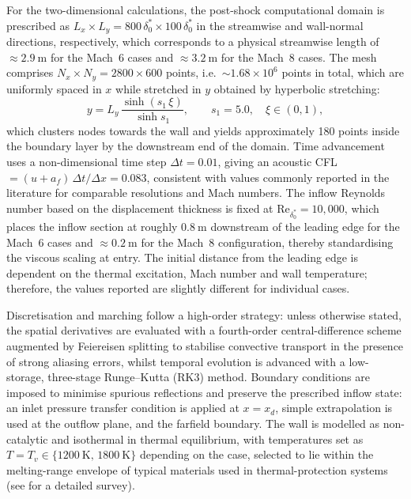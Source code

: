 For the two-dimensional calculations, the post-shock computational domain is prescribed as $L_x\times L_y=800\,\delta^{*}_{0}\times 100\,\delta^{*}_{0}$ in the streamwise and wall-normal directions, respectively, which corresponds to a physical streamwise length of $\approx 2.9~\mathrm{m}$ for the Mach~6 cases and $\approx 3.2~\mathrm{m}$ for the Mach~8 cases. The mesh comprises $N_x\times N_y=2800\times 600$ points, i.e.\ $\sim 1.68\times 10^{6}$ points in total, which are uniformly spaced in $x$ while stretched in $y$ obtained by hyperbolic stretching:
\begin{equation}
y=L_y\,\frac{\sinh\!\left(s_1\,\xi\right)}{\sinh s_1},\qquad s_1=5.0,\quad \xi\in(0,1),
\end{equation}
which clusters nodes towards the wall and yields approximately 180 points inside the boundary layer by the downstream end of the domain. Time advancement uses a non-dimensional time step $\Delta t=0.01$, giving an acoustic \gls{CFL}$=(u+a_f)\,\Delta t/\Delta x=0.083$, consistent with values commonly reported in the literature for comparable resolutions and Mach numbers. The inflow Reynolds number based on the displacement thickness is fixed at $\mathrm{Re}_{\delta^{*}_0}=10{,}000$, which places the inflow section at roughly $ 0.8~\mathrm{m}$ downstream of the leading edge for the Mach~6 cases and $\approx 0.2~\mathrm{m}$ for the Mach~8 configuration, thereby standardising the viscous scaling at entry. The initial distance from the leading edge is dependent on the thermal excitation, Mach number and wall temperature; therefore, the values reported are slightly different for individual cases.

Discretisation and marching follow a high-order strategy: unless otherwise stated, the spatial derivatives are evaluated with a fourth-order central-difference scheme augmented by Feiereisen splitting to stabilise convective transport in the presence of strong aliasing errors, whilst temporal evolution is advanced with a low-storage, three-stage Runge--Kutta (RK3) method. Boundary conditions are imposed to minimise spurious reflections and preserve the prescribed inflow state: an inlet pressure transfer condition is applied at $x=x_d$, simple extrapolation is used at the outflow plane, and the farfield boundary. The wall is modelled as non-catalytic and isothermal in thermal equilibrium, with temperatures set as $T=T_v\in\{1200~\mathrm{K},\,1800~\mathrm{K}\}$ depending on the case, selected to lie within the melting-range envelope of typical materials used in thermal-protection systems (see \cite{CedillosBarraza2016} for a detailed survey).

